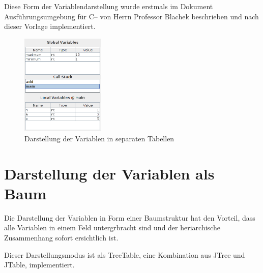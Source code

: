 Diese Form der Variablendarstellung wurde erstmals im Dokument Ausführungsumgebung für C-- von Herrn Professor Blachek beschrieben und nach dieser Vorlage implementiert.
\begin{figure}
\includegraphics[width=4cm]{./media/images/gui/var/callstack.png}
\caption{Darstellung der Variablen in separaten Tabellen}
\label{var_sep}
\end{figure}

\section{Darstellung der Variablen als Baum}

Die Darstellung der Variablen in Form einer Baumstruktur hat den Vorteil, dass alle Variablen in einem Feld untergrbracht sind und der heriarchische Zusammenhang sofort ersichtlich ist.

Dieser Darstellungsmodus ist als TreeTable, eine Kombination aus JTree und JTable, implementiert.
